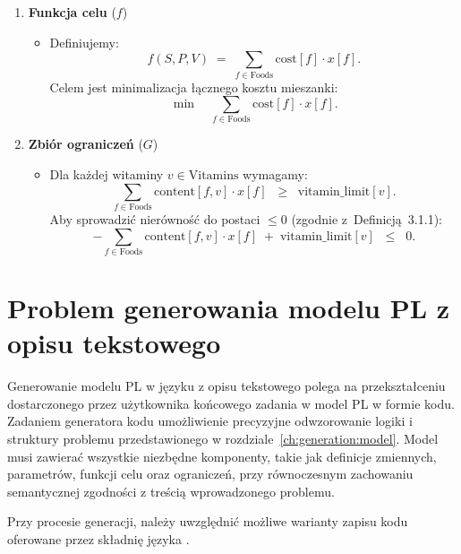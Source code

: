 \begin{enumerate}
  \item \textbf{Funkcja celu} (\boldmath$f$)
  \begin{itemize}
    \item Definiujemy:
    \[
      f(S,P,V) \;=\; \sum_{f \in \text{Foods}} \text{cost}[f] \cdot x[f].
    \]
    Celem jest minimalizacja łącznego kosztu mieszanki:
    \[
      \min \quad \sum_{f \in \text{Foods}} \text{cost}[f] \cdot x[f].
    \]
  \end{itemize}

  \item \textbf{Zbiór ograniczeń} (\boldmath$G$)
  \begin{itemize}
    \item Dla każdej witaminy $v \in \text{Vitamins}$ wymagamy:
    \[
      \sum_{f \in \text{Foods}} \text{content}[f,v] \cdot x[f]
      \;\;\geq\;\;
      \text{vitamin\_limit}[v].
    \]
    \medskip
    Aby sprowadzić nierówność do postaci $\leq 0$ (zgodnie z~Definicją~3.1.1):
    \[
      - \sum_{f \in \text{Foods}} \text{content}[f,v] \cdot x[f]
      \;+\;
      \text{vitamin\_limit}[v]
      \;\;\leq\;\; 0.
    \]
    \end{itemize}
\end{enumerate}

\section{Problem generowania modelu PL z opisu tekstowego}\label{ch:generation:generating}

Generowanie modelu PL w języku  z opisu tekstowego polega na przekształceniu dostarczonego przez użytkownika końcowego zadania w model PL w formie kodu. Zadaniem generatora kodu   umożliwienie precyzyjne odwzorowanie logiki i struktury problemu przedstawionego w rozdziale~\ref{ch:generation:model}. Model musi zawierać wszystkie niezbędne komponenty, takie jak definicje zmiennych, parametrów, funkcji celu oraz ograniczeń, przy równoczesnym zachowaniu semantycznej zgodności z treścią wprowadzonego problemu.

Przy procesie generacji, należy uwzględnić możliwe warianty zapisu kodu oferowane przez składnię języka . 

